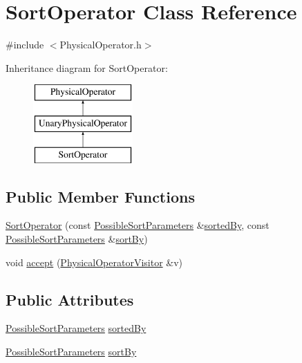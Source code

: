 \hypertarget{class_sort_operator}{\section{Sort\+Operator Class Reference}
\label{class_sort_operator}
}


{\ttfamily \#include $<$Physical\+Operator.\+h$>$}

Inheritance diagram for Sort\+Operator\+:\begin{figure}[H]
\begin{center}
\leavevmode
\includegraphics[height=3.000000cm]{class_sort_operator}
\end{center}
\end{figure}
\subsection*{Public Member Functions}
\begin{DoxyCompactItemize}
\item 
\hyperlink{class_sort_operator_aae40824efc238dfbf2bbde0badb66138}{Sort\+Operator} (const \hyperlink{class_possible_sort_parameters}{Possible\+Sort\+Parameters} \&\hyperlink{class_sort_operator_a7e3eb99b6ce1ed9d927a5e3975269be5}{sorted\+By}, const \hyperlink{class_possible_sort_parameters}{Possible\+Sort\+Parameters} \&\hyperlink{class_sort_operator_a36cfb27acb196ceb5d801b62dc2494cc}{sort\+By})
\item 
void \hyperlink{class_sort_operator_aff5d834234616ce2d36efda9639b734b}{accept} (\hyperlink{class_physical_operator_visitor}{Physical\+Operator\+Visitor} \&v)
\end{DoxyCompactItemize}
\subsection*{Public Attributes}
\begin{DoxyCompactItemize}
\item 
\hyperlink{class_possible_sort_parameters}{Possible\+Sort\+Parameters} \hyperlink{class_sort_operator_a7e3eb99b6ce1ed9d927a5e3975269be5}{sorted\+By}
\item 
\hyperlink{class_possible_sort_parameters}{Possible\+Sort\+Parameters} \hyperlink{class_sort_operator_a36cfb27acb196ceb5d801b62dc2494cc}{sort\+By}
\end{DoxyCompactItemize}


